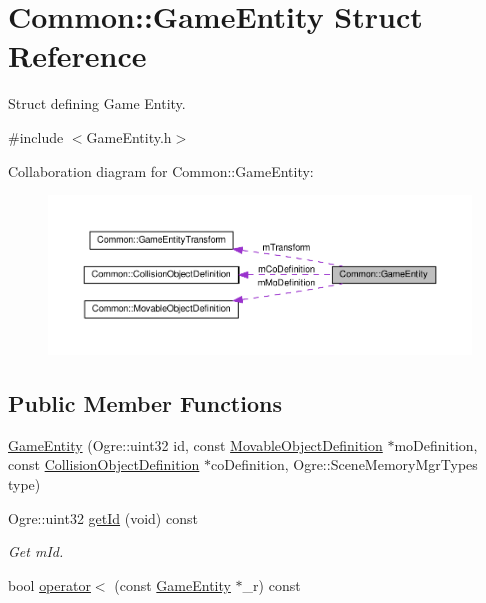 \hypertarget{struct_common_1_1_game_entity}{}\section{Common\+:\+:Game\+Entity Struct Reference}
\label{struct_common_1_1_game_entity}


Struct defining Game Entity.  




{\ttfamily \#include $<$Game\+Entity.\+h$>$}



Collaboration diagram for Common\+:\+:Game\+Entity\+:\nopagebreak
\begin{figure}[H]
\begin{center}
\leavevmode
\includegraphics[width=350pt]{struct_common_1_1_game_entity__coll__graph}
\end{center}
\end{figure}
\subsection*{Public Member Functions}
\begin{DoxyCompactItemize}
\item 
\hyperlink{struct_common_1_1_game_entity_a1478181c16b5132fce75352afa88a3a8}{Game\+Entity} (Ogre\+::uint32 id, const \hyperlink{struct_common_1_1_movable_object_definition}{Movable\+Object\+Definition} $\ast$mo\+Definition, const \hyperlink{struct_common_1_1_collision_object_definition}{Collision\+Object\+Definition} $\ast$co\+Definition, Ogre\+::\+Scene\+Memory\+Mgr\+Types type)
\item 
\mbox{\label{struct_common_1_1_game_entity_ada4fa423b9c2efaa5ac97f8a081c7d7b}} 
Ogre\+::uint32 \hyperlink{struct_common_1_1_game_entity_ada4fa423b9c2efaa5ac97f8a081c7d7b}{get\+Id} (void) const
\begin{DoxyCompactList}\small\item\em Get m\+Id. \end{DoxyCompactList}\item 
bool \hyperlink{struct_common_1_1_game_entity_a9d46d0e1dfa65029ee7acda84b5d648f}{operator$<$} (const \hyperlink{struct_common_1_1_game_entity}{Game\+Entity} $\ast$\+\_\+r) const
\end{DoxyCompactItemize}
